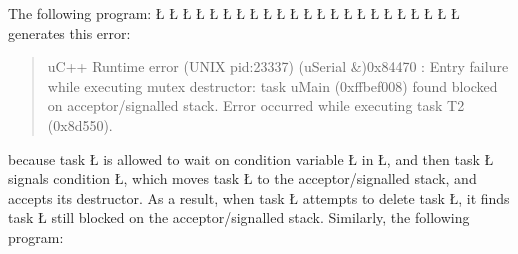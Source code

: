 \documentclass[openright,twoside]{report}
\begin{document}
The following program:
\LGinlinefalse\LGbegin\lgrinde
\L{}
\L{\LB{}}
\L{}
\L{\LB{}}
\L{}
\L{\LB{}}
\L{\LB{}}
\CE{}\L{\LB{}}
\CE{}\L{\LB{}}
\CE{}\L{\LB{}}
\L{\LB{\};}}
\endlgrinde\LGend
\LGinlinefalse\LGbegin\lgrinde
\L{}
\L{\LB{}}
\L{\LB{}}
\L{}
\L{\LB{}}
\L{\LB{\};}}
\endlgrinde\LGend
\LGinlinefalse\LGbegin\lgrinde
\L{}
\L{\LB{}}
\L{\LB{}}
\L{\LB{}}
\CE{}\L{\LB{}}
\L{\LB{\}}}
\endlgrinde\LGend
generates this error:
\begin{quote}
\BGfont
uC++ Runtime error (UNIX pid:23337) (uSerial \&)0x84470 : Entry failure while executing mutex destructor: task uMain (0xffbef008) found blocked on acceptor/signalled stack.
Error occurred while executing task T2 (0x8d550).
\end{quote}
because task \LGinlinetrue\LGbegin\lgrinde\L{}\endlgrinde\LGend{} is allowed to wait on condition variable \LGinlinetrue\LGbegin\lgrinde\L{}\endlgrinde\LGend{} in \LGinlinetrue\LGbegin\lgrinde\L{}\endlgrinde\LGend{}, and then task \LGinlinetrue\LGbegin\lgrinde\L{}\endlgrinde\LGend{} signals condition \LGinlinetrue\LGbegin\lgrinde\L{}\endlgrinde\LGend{}, which moves task \LGinlinetrue\LGbegin\lgrinde\L{}\endlgrinde\LGend{} to the acceptor/signalled stack, and accepts its destructor.
As a result, when task \LGinlinetrue\LGbegin\lgrinde\L{}\endlgrinde\LGend{} attempts to delete task \LGinlinetrue\LGbegin\lgrinde\L{}\endlgrinde\LGend{}, it finds task \LGinlinetrue\LGbegin\lgrinde\L{}\endlgrinde\LGend{} still blocked on the acceptor/signalled stack.
Similarly, the following program:
\LGinlinefalse\LGbegin\lgrinde
\end{document}
